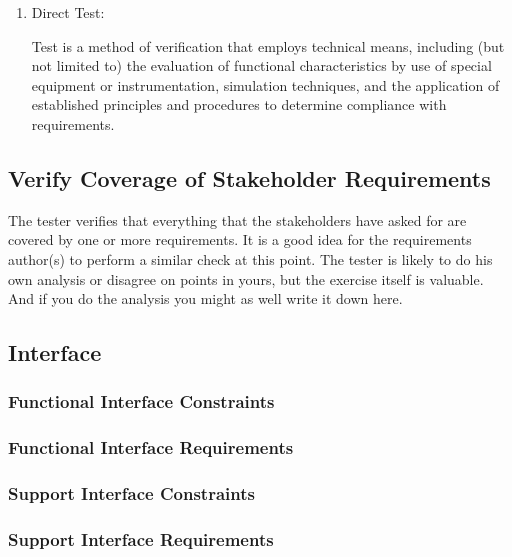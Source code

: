 \begin{slshape}
\begin{enumerate}
		\item Direct Test:

	Test is a method of verification that employs technical means, including (but not 
	limited to) the evaluation of functional characteristics by use of special equipment
	or instrumentation, simulation techniques, and the application of established 
	principles and procedures to determine compliance with requirements.
			
	\end{enumerate}		
	
\end{slshape}

\subsection{Verify Coverage of Stakeholder Requirements}

\begin{slshape}
\color{blue}
The tester verifies that everything that the stakeholders have asked for are covered by one or more requirements.  It is a good idea for the requirements author(s) to perform a similar check at this point.  The tester is likely to do his own analysis or disagree on points in yours, but the exercise itself is valuable. And if you do the analysis you might as well write it down here.   
\end{slshape}


\subsection{Interface}

\subsubsection{Functional Interface Constraints}

\subsubsection{Functional Interface Requirements}

\subsubsection{Support Interface Constraints}

\subsubsection{Support Interface Requirements}

